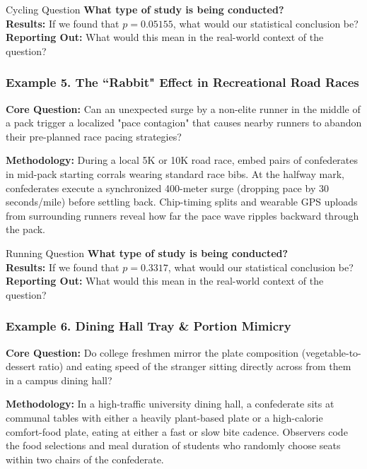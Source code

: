 \documentclass{beamer}
\begin{document}
\begin{frame}{Cycling Question}
\textbf{What type of study is being conducted?}\\[9mm]
\pause
\textbf{Results:} If we found that $p = 0.05155$, what would our statistical conclusion be?\\[9mm]
\pause
\textbf{Reporting Out:} What would this mean in the real-world context of the question? 
\vspace{25mm}
\end{frame}

\begin{frame}\frametitle{Example 5. The ``Rabbit" Effect in Recreational Road Races}
\textbf{Core Question:} Can an unexpected surge by a non-elite runner in the middle of a pack trigger a localized "pace contagion" that causes nearby runners to abandon their pre-planned race pacing strategies?

\pause
\textbf{Methodology:} During a local 5K or 10K road race, embed pairs of confederates in mid-pack starting corrals wearing standard race bibs. At the halfway mark, confederates execute a synchronized 400-meter surge (dropping pace by 30 seconds/mile) before settling back. Chip-timing splits and wearable GPS uploads from surrounding runners reveal how far the pace wave ripples backward through the pack.
\vspace{15mm}
\end{frame}

\begin{frame}{Running Question}
\textbf{What type of study is being conducted?}\\[9mm]
\pause
\textbf{Results:} If we found that $p = 0.3317$, what would our statistical conclusion be?\\[9mm]
\pause
\textbf{Reporting Out:} What would this mean in the real-world context of the question? 
\vspace{25mm}
\end{frame}

\begin{frame}\frametitle{Example 6. Dining Hall Tray \& Portion Mimicry}
\textbf{Core Question:} Do college freshmen mirror the plate composition (vegetable-to-dessert ratio) and eating speed of the stranger sitting directly across from them in a campus dining hall?

\pause
\textbf{Methodology:} In a high-traffic university dining hall, a confederate sits at communal tables with either a heavily plant-based plate or a high-calorie comfort-food plate, eating at either a fast or slow bite cadence. Observers code the food selections and meal duration of students who randomly choose seats within two chairs of the confederate.
\vspace{15mm}
\end{frame}
\end{document}
